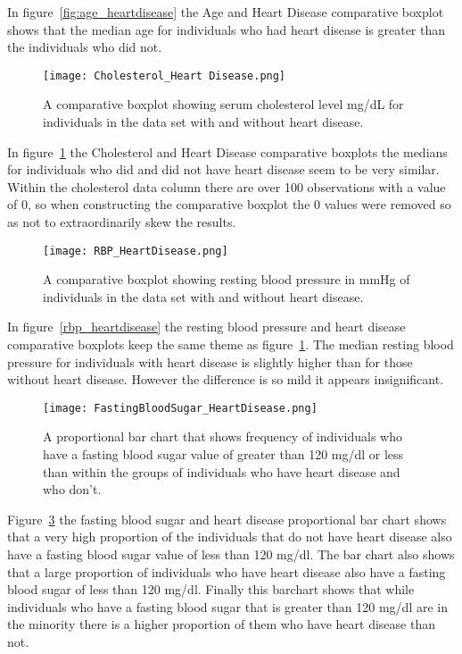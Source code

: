 \documentclass[12pt]{article}
\begin{document}
In figure~\ref*{fig:age_heartdisease} the Age and Heart Disease comparative boxplot shows that the median age for individuals who had heart disease is greater than the individuals who did not. 
\begin{figure}[tbp]
  \centering
  \texttt{[image: Cholesterol\_Heart Disease.png]}
  \caption{A comparative boxplot showing serum cholesterol level mg/dL for individuals in the data set with and without heart disease.}
  \label{fig:cholesterol_heartdisease}
\end{figure}
In figure~\ref*{fig:cholesterol_heartdisease} the Cholesterol and Heart Disease comparative boxplots the medians for individuals who did and did not have heart disease seem to be very similar. Within the cholesterol data column there are over 100 observations with a value of 0, so when constructing the comparative boxplot the 0 values were removed so as not to extraordinarily skew the results.  
\begin{figure}[tbp]
  \centering
  \texttt{[image: RBP\_HeartDisease.png]}
  \caption{A comparative boxplot showing resting blood pressure in mmHg of individuals in the data set with and without heart disease.}
  \label{fig:rbp_heartdisease}
\end{figure}
In figure~\ref*{rbp_heartdisease} the resting blood pressure and heart disease comparative boxplots keep the same theme as figure~\ref*{fig:cholesterol_heartdisease}. The median resting blood pressure for individuals with heart disease is slightly higher than for those without heart disease. However the difference is so mild it appears insignificant. 
\begin{figure}[tbp]
  \centering
  \texttt{[image: FastingBloodSugar\_HeartDisease.png]}
  \caption{A proportional bar chart that shows frequency of individuals who have a fasting blood sugar value of greater than 120 mg/dl or less than within the groups of individuals who have heart disease and who don't.}
  \label{fig:FBS_heartdisease}
\end{figure}
Figure~\ref*{fig:FBS_heartdisease} the fasting blood sugar and heart disease proportional bar chart shows that a very high proportion of the individuals that do not have heart disease also have a fasting blood sugar value of less than 120 mg/dl. The bar chart also shows that a large proportion of individuals who have heart disease also have a fasting blood sugar of less than 120 mg/dl. Finally this barchart shows that while individuals who have a fasting blood sugar that is greater than 120 mg/dl are in the minority there is a higher proportion of them who have heart disease than not. 
\end{document}
